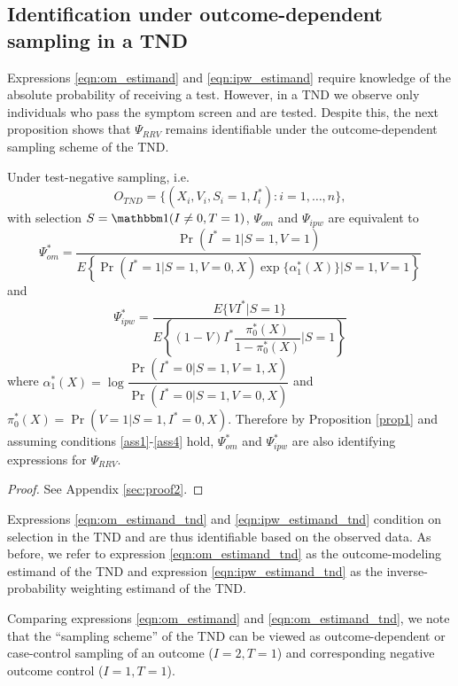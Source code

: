 \documentclass[11pt]{article}
\begin{document}
\subsection{Identification under outcome-dependent sampling in a TND}

Expressions \ref{eqn:om_estimand} and \ref{eqn:ipw_estimand} require knowledge of the absolute probability of receiving a test. However, in a TND we observe only individuals who pass the symptom screen and are tested. Despite this, the next proposition shows that $\Psi_{RRV}$ remains identifiable under the outcome-dependent sampling scheme of the TND. 
 \begin{proposition}\label{prop2}
      Under test-negative sampling, i.e. 
      $$O_{TND} = \{(X_i, V_i, S_i=1, I^*_i) : i = 1, \ldots, n\},$$ 
      with selection $S = \mathbbm 1(I\neq 0, T = 1)$, $\Psi_{om}$ and $\Psi_{ipw}$ are equivalent to 
    \begin{equation}\label{eqn:om_estimand_tnd}
        \Psi_{om}^* = \dfrac{\Pr(I^* = 1 | S = 1, V = 1)}{E\left\{  \Pr(I^* = 1 | S = 1, V = 0, X) \exp\{\alpha^*_1(X)\}\Big| S = 1, V = 1 \right\}}
    \end{equation}
    and 
    \begin{equation}\label{eqn:ipw_estimand_tnd}
        \Psi_{ipw}^* = \dfrac{E\{VI^*|S =1\}}{E\left\{ (1 - V) I^* \dfrac{\pi^*_0(X)}{1 - \pi^*_0(X)} \bigg| S = 1\right\}}
    \end{equation}
    where $\alpha^*_1(X) = \log \dfrac{\Pr(I^* = 0 | S = 1, V = 1, X)}{\Pr(I^* = 0| S = 1, V = 0, X)}$ and $\pi^*_0(X) = \Pr(V = 1| S = 1, I^* = 0, X)$. Therefore by Proposition \ref{prop1} and assuming conditions \ref{ass1}-\ref{ass4} hold, $\Psi_{om}^*$ and $\Psi_{ipw}^*$ are also identifying expressions for $\Psi_{RRV}$.
 \end{proposition}
 \begin{proof}
    See Appendix \ref{sec:proof2}.
 \end{proof}
    
 Expressions \ref{eqn:om_estimand_tnd} and  \ref{eqn:ipw_estimand_tnd} condition on selection in the TND and are thus identifiable based on the observed data. As before, we refer to expression \ref{eqn:om_estimand_tnd} as the outcome-modeling estimand of the TND and expression \ref{eqn:ipw_estimand_tnd} as the inverse-probability weighting estimand of the TND.

 \begin{remark}
     Comparing expressions \ref{eqn:om_estimand} and \ref{eqn:om_estimand_tnd}, we note that the ``sampling scheme'' of the TND can be viewed as outcome-dependent or case-control sampling of an outcome ($I=2, T=1$) and corresponding negative outcome control ($I=1, T =1$). 
 \end{remark}
\end{document}
